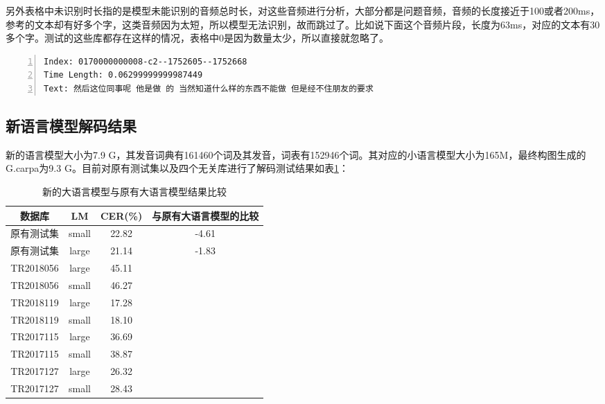 另外表格中未识别时长指的是模型未能识别的音频总时长，对这些音频进行分析，大部分都是问题音频，音频的长度接近于100或者200ms，参考的文本却有好多个字，这类音频因为太短，所以模型无法识别，故而跳过了。比如说下面这个音频片段，长度为63ms，对应的文本有30多个字。测试的这些库都存在这样的情况，表格中0是因为数量太少，所以直接就忽略了。
\begin{lstlisting}[language=shell, numbers=left, 
         numberstyle=\tiny,keywordstyle=\color{blue!70},
         commentstyle=\color{red!50!green!50!blue!50},frame=shadowbox,
         rulesepcolor=\color{red!20!green!20!blue!20},basicstyle=\ttfamily]
Index: 0170000000008-c2--1752605--1752668  
Time Length: 0.06299999999987449 
Text: 然后这位同事呢 他是做 的 当然知道什么样的东西不能做 但是经不住朋友的要求
\end{lstlisting}

\subsection{新语言模型解码结果}
新的语言模型大小为7.9 G，其发音词典有161460个词及其发音，词表有152946个词。其对应的小语言模型大小为165M，最终构图生成的G.carpa为9.3 G。目前对原有测试集以及四个无关库进行了解码测试结果如表\ref{tab:new-lm}：
\begin{table}[h]
 \centering
 \caption{新的大语言模型与原有大语言模型结果比较}
	 \begin{tabular*}{1\textwidth}{@{\extracolsep{\fill}}cccc}
	 \toprule
		{\bf 数据库   } & {\bf LM   } &  {\bf CER(\%)    } & {\bf 与原有大语言模型的比较} \\
	 \midrule
		 原有测试集 & small & 22.82   & -4.61  \\
		 原有测试集 & large & 21.14   & -1.83  \\
		 TR2018056 & large & 45.11   &        \\
		 TR2018056 & small & 46.27   &        \\
		 TR2018119 & large & 17.28   &        \\
		 TR2018119 & small & 18.10   &        \\
		 TR2017115 & large & 36.69   &        \\
		 TR2017115 & small & 38.87   &        \\
		 TR2017127 & large & 26.32   &        \\
		 TR2017127 & small & 28.43   &        \\
	 \bottomrule
	 \end{tabular*}%
 \label{tab:new-lm}%
\end{table}%

